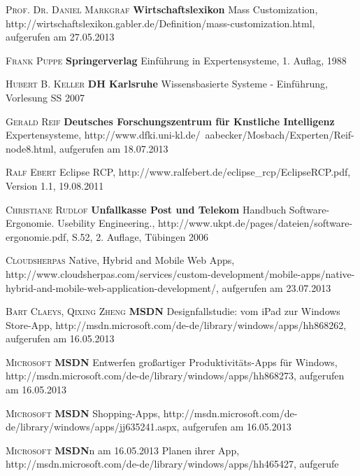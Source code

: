 \begin{thebibliography}{---}

           \textsc{Prof. Dr. Daniel Markgraf }
          \textbf{Wirtschaftslexikon}
          Mass Customization, http://wirtschaftslexikon.gabler.de/Definition/mass-customization.html, aufgerufen am 27.05.2013
          
 			 \textsc{Frank Puppe}
 			 \textbf{Springerverlag}
 			 Einführung in Expertensysteme, 1. Auflag, 1988
 			 
  			 \textsc{Hubert B. Keller}
  			 \textbf{DH Karlsruhe}
  			 Wissensbasierte Systeme - Einführung, Vorlesung SS 2007
  			 
             \textsc{Gerald Reif}
            \textbf{Deutsches Forschungszentrum für Knstliche Intelligenz}
            Expertensysteme, http://www.dfki.uni-kl.de/~aabecker/Mosbach/Experten/Reif-node8.html, aufgerufen am 18.07.2013
            
               \textsc{Ralf Ebert}
              Eclipse RCP, http://www.ralfebert.de/eclipse\_rcp/EclipseRCP.pdf, Version 1.1, 19.08.2011
  			
 			
           \textsc{Christiane Rudlof}
          \textbf{Unfallkasse Post und Telekom}
          Handbuch Software-Ergonomie. Usebility Engineering., http://www.ukpt.de/pages/dateien/software-ergonomie.pdf, S.52, 2. Auflage, Tübingen 2006

           \textsc{Cloudsherpas}
          Native, Hybrid and Mobile Web Apps, http://www.cloudsherpas.com/services/custom-development/mobile-apps/native-hybrid-and-mobile-web-application-development/, aufgerufen am 23.07.2013

           \textsc{Bart Claeys, Qixing Zheng}
          \textbf{MSDN}
          Designfallstudie: vom iPad zur Windows Store-App, http://msdn.microsoft.com/de-de/library/windows/apps/hh868262, aufgerufen am 16.05.2013
          
            \textsc{Microsoft}
           \textbf{MSDN}
           Entwerfen großartiger Produktivitäts-Apps für Windows, http://msdn.microsoft.com/de-de/library/windows/apps/hh868273, aufgerufen am 16.05.2013
           
              \textsc{Microsoft}
             \textbf{MSDN}
             Shopping-Apps, http://msdn.microsoft.com/de-de/library/windows/apps/jj635241.aspx, aufgerufen am 16.05.2013
             
                \textsc{Microsoft}
               \textbf{MSDN}n am 16.05.2013
 Planen ihrer App, http://msdn.microsoft.com/de-de/library/windows/apps/hh465427, aufgerufe

 
\end{thebibliography}

